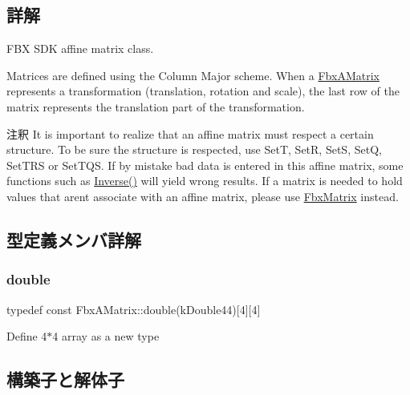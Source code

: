 \subsection{詳解}
F\+BX S\+DK affine matrix class.

Matrices are defined using the Column Major scheme. When a \hyperlink{class_fbx_a_matrix}{Fbx\+A\+Matrix} represents a transformation (translation, rotation and scale), the last row of the matrix represents the translation part of the transformation.

\begin{DoxyRemark}{注釈}
It is important to realize that an affine matrix must respect a certain structure. To be sure the structure is respected, use SetT, SetR, SetS, SetQ, Set\+T\+RS or Set\+T\+QS. If by mistake bad data is entered in this affine matrix, some functions such as \hyperlink{class_fbx_a_matrix_a4093cf977851b49760e1c24c99d5bae7}{Inverse()} will yield wrong results. If a matrix is needed to hold values that aren\textquotesingle{}t associate with an affine matrix, please use \hyperlink{class_fbx_matrix}{Fbx\+Matrix} instead. 
\end{DoxyRemark}


\subsection{型定義メンバ詳解}
\mbox{\label{class_fbx_a_matrix_ad463edbb9fea344643297701f159faa7}} 
\subsubsection{\texorpdfstring{double}{double}}
{\footnotesize\ttfamily typedef const Fbx\+A\+Matrix\+::double(k\+Double44)\mbox{[}4\mbox{]}\mbox{[}4\mbox{]}}



Define 4$\ast$4 array as a new type 



\subsection{構築子と解体子}
\mbox{\label{class_fbx_a_matrix_afde94bf7fa3e5a001cf8c0733aab69ea}} 
